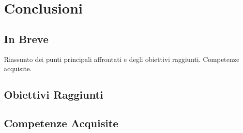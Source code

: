 \chapter{Conclusioni}

\section{In Breve}
Riassunto dei punti principali affrontati e degli obiettivi raggiunti. Competenze acquisite.

\section{Obiettivi Raggiunti}
\section{Competenze Acquisite}